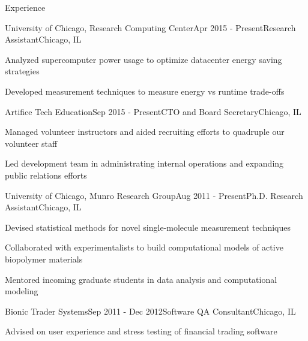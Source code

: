 \documentclass{resume} %
\begin{document}
\begin{rSection}{Experience}

\begin{rSubsection}{University of Chicago, Research Computing Center}{Apr 2015 - Present}{Research Assistant}{Chicago, IL}
\item Analyzed supercomputer power usage to optimize datacenter energy saving strategies
\item Developed measurement techniques to measure energy vs runtime trade-offs

\end{rSubsection}


\begin{rSubsection}{Artifice Tech Education}{Sep 2015 - Present}{CTO and Board Secretary}{Chicago, IL}
	\item Managed volunteer instructors and aided recruiting efforts to quadruple our volunteer staff
	\item Led development team in administrating internal operations and expanding public relations efforts
	
\end{rSubsection}


\begin{rSubsection}{University of Chicago, Munro Research Group}{Aug 2011 - Present}{Ph.D. Research Assistant}{Chicago, IL}
\item Devised statistical methods for novel single-molecule measurement techniques
\item Collaborated with experimentalists to build computational models of active biopolymer materials
\item Mentored incoming graduate students in data analysis and computational modeling

\end{rSubsection}


\begin{rSubsection}{Bionic Trader Systems}{Sep 2011 - Dec 2012}{Software QA Consultant}{Chicago, IL}
\item Advised on user experience and stress testing of financial trading software

\end{rSubsection}


\end{rSection}
\end{document}
